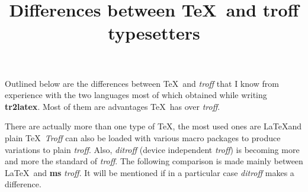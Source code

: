 
\def\troff{{\it troff}}
\def\Troff{{\it Troff}}
\def\ditroff{{\it ditroff}}
\def\Ditroff{{\it Ditroff}}

\title{Differences between \TeX\ and troff typesetters}

Outlined below are the differences between \TeX\ and \troff\/ that
I know from experience with the two languages most of which
obtained while writing {\bf tr2latex}.
Most of them are advantages \TeX\ has over \troff.

There are actually more than one type of \TeX, the most
used ones are \LaTeX and plain \TeX\
\Troff\/ can also be loaded with various macro packages to
produce variations to plain \troff. Also, \ditroff\/ (device independent \troff)
is becoming more and more the standard of \troff.
The following comparison is made mainly between \LaTeX\ and {\bf ms} \troff.
It will be mentioned if in a particular case \ditroff\/ makes a difference.

